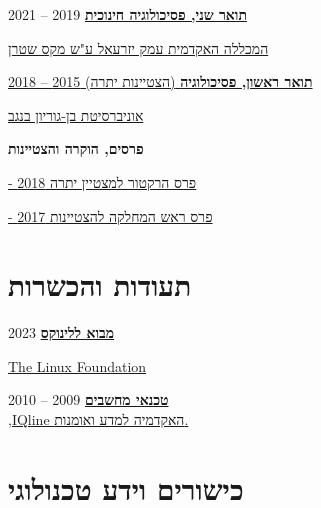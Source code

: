 \documentclass[
	12pt,a4paper %
]{article}
\begin{document}
\begin{hebrew}
	\href{https://loona-il.000webhostapp.com/resume-references/edu-psy-ma.pdf}{\textbf{\large תואר שני, פסיכולוגיה חינוכית}} \hfill 2019 -- 2021

	\noindent\href{https://loona-il.000webhostapp.com/resume-references/edu-psy-ma.pdf}{ המכללה האקדמית עמק יזרעאל ע"ש מקס שטרן}

	\noindent\dotfill %

	\noindent\href{https://loona-il.000webhostapp.com/resume-references/BA-and-honorary.pdf}{\large \noindent\textbf{תואר ראשון, פסיכולוגיה  } \normalsize{(הצטיינות יתרה)} \hfill 2015 -- 2018}

	\noindent\href{https://loona-il.000webhostapp.com/resume-references/BA-and-honorary.pdf}{  אוניברסיטת בן-גוריון בנגב  }

	\noindent\textbf{פרסים, הוקרה והצטיינות}

	\href{https://loona-il.000webhostapp.com/resume-references/BA-and-honorary.pdf}{- פרס הרקטור למצטיין יתרה \hfill 2018}

	\href{https://loona-il.000webhostapp.com/resume-references/BA-and-honorary.pdf}{- פרס ראש המחלקה להצטיינות \hfill 2017}

	\begin{paracol}{2} %
		\section{תעודות והכשרות}

\href{https://courses.edx.org/certificates/dc4f0cd758304785a2ea62cca29e6a86}{\textbf{מבוא ללינוקס}} \hfill 2023 \\
\begin{english}
\href{https://courses.edx.org/certificates/dc4f0cd758304785a2ea62cca29e6a86}{The Linux Foundation} \end{english}

		\href{https://loona-il.000webhostapp.com/resume-references/computer-technitian-certificate.jpg}{\textbf{טכנאי מחשבים}} \hfill 2009 -- 2010 \\
		\href{https://loona-il.000webhostapp.com/resume-references/computer-technitian-certificate.jpg}{,IQline האקדמיה למדע ואומנות.}

		\section{כישורים וידע טכנולוגי}


\end{paracol}
\end{hebrew}
\end{document}
